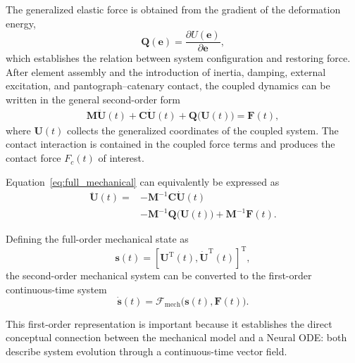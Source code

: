 \documentclass[journal,twoside]{IEEEtran}
\begin{document}
The generalized elastic force is obtained from the gradient of the
deformation energy,
\begin{equation}
    \mathbf{Q}(\mathbf{e})
    =
    \frac{\partial U(\mathbf{e})}
         {\partial \mathbf{e}},
    \label{eq:generalized_force}
\end{equation}
which establishes the relation between system configuration and restoring
force. After element assembly and the introduction of inertia, damping,
external excitation, and pantograph--catenary contact, the coupled dynamics
can be written in the general second-order form
\begin{equation}
\begin{aligned}
    \mathbf{M}\ddot{\mathbf{U}}(t)
    +\mathbf{C}\dot{\mathbf{U}}(t)
    +\mathbf{Q}\big(\mathbf{U}(t)\big)
    =
    \mathbf{F}(t),
\end{aligned}
\label{eq:full_mechanical}
\end{equation}
where $\mathbf{U}(t)$ collects the generalized coordinates of the coupled
system. The contact interaction is contained in the coupled force terms and
produces the contact force $F_c(t)$ of interest.

Equation~\eqref{eq:full_mechanical} can equivalently be expressed as
\begin{equation}
\begin{aligned}
    \ddot{\mathbf{U}}(t)
    ={}&
    -\mathbf{M}^{-1}\mathbf{C}\dot{\mathbf{U}}(t)\\
    &-\mathbf{M}^{-1}
    \mathbf{Q}\big(\mathbf{U}(t)\big)
    +\mathbf{M}^{-1}\mathbf{F}(t).
\end{aligned}
\label{eq:full_acceleration}
\end{equation}

Defining the full-order mechanical state as
\begin{equation}
    \mathbf{s}(t)
    =
    \left[
        \mathbf{U}^{\mathrm T}(t),
        \dot{\mathbf{U}}^{\mathrm T}(t)
    \right]^{\mathrm T},
    \label{eq:full_state}
\end{equation}
the second-order mechanical system can be converted to the first-order
continuous-time system
\begin{equation}
    \dot{\mathbf{s}}(t)
    =
    \mathcal{F}_{\mathrm{mech}}
    \big(
        \mathbf{s}(t),\mathbf{F}(t)
    \big).
    \label{eq:full_first_order}
\end{equation}

This first-order representation is important because it establishes the
direct conceptual connection between the mechanical model and a Neural ODE:
both describe system evolution through a continuous-time vector field.
\end{document}
